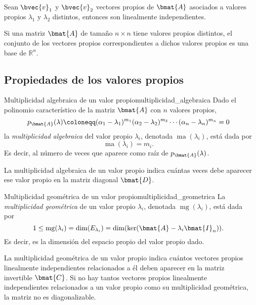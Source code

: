 \documentclass{fmbnotes}
\begin{document}
Sean \(\bvec{v}_1\) y \(\bvec{v}_2\) vectores propios de \(\bmat{A}\) asociados a valores propios \(\lambda_1\) y \(\lambda_2\) distintos, entonces son linealmente independientes.

\begin{tip}
	Si una matriz \(\bmat{A}\) de tamaño \(n\times n\) tiene valores propios distintos, el conjunto de los vectores propios correspondientes a dichos valores propios es una base de \(\mathbb{R}^{n}\).
\end{tip}

\subsection{Propiedades de los valores propios}

\begin{definicion}{Multiplicidad algebraica de un valor propio}{multiplicidad_algebraica}
	Dado el polinomio característico de la matriz \(\bmat{A}\) con \(n\) valores propios,
	\[ p_{\bmat{A}}(\lambda) \coloneqq (\alpha_1-\lambda_1)^{m_1}(\alpha_2-\lambda_2)^{m_2}\cdots(\alpha_n-\lambda_n)^{m_n} =0 \]
	la \emph{multiplicidad algebraica} del valor propio \(\lambda_i\), denotada \( \operatorname{ma}(\lambda_i) \), está dada por
	\[\operatorname{ma}(\lambda_i)=m_i.\]
	Es decir, al número de veces que aparece como raíz de \(p_{\bmat{A}}(\lambda)\).
\end{definicion}

La multiplicidad algebraica de un valor propio indica cuántas veces debe aparecer ese valor propio en la matriz diagonal \(\bmat{D}\). 

\begin{definicion}{Multiplicidad geométrica de un valor propio}{multiplicidad_geometrica}
	La \emph{multiplicidad geométrica} de un valor propio \(\lambda_i\), denotada \( \operatorname{mg}(\lambda_i) \), está dada por 
	\[1\leq\operatorname{mg}(\lambda_i)=\dim(E_{\lambda_i})=\dim(\ker(\bmat{A}-\lambda_i\bmat{I}_n)).\]
	Es decir, es la dimensión del espacio propio del valor propio dado.
\end{definicion}

La multiplicidad geométrica de un valor propio indica cuántos vectores propios linealmente independientes relacionados a él deben aparecer en la matriz invertible \(\bmat{C}\). Si no hay tantos vectores propios linealmente independientes relacionados a un valor propio como su multiplicidad geométrica, la matriz no es diagonalizable.
\end{document}
